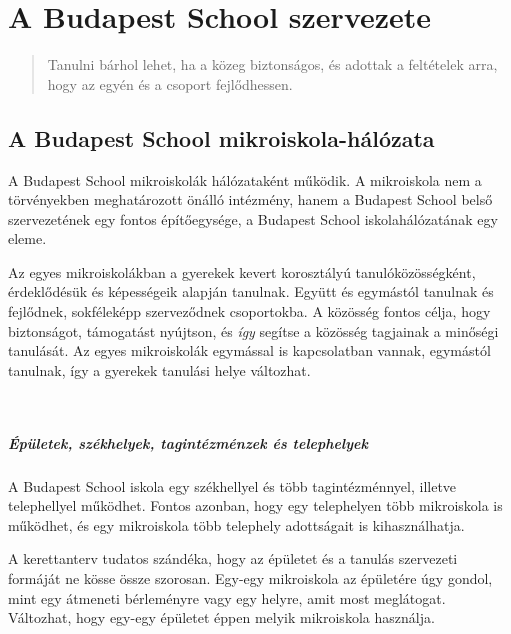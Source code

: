
\chapter{A Budapest School szervezete}
\begin{quote}
Tanulni bárhol lehet, ha a közeg biztonságos, és adottak a feltételek arra, hogy az egyén és a csoport fejlődhessen.
\end{quote}

\section{A Budapest School mikroiskola-hálózata}

 A Budapest School mikroiskolák hálózataként működik. A mikroiskola nem a
 törvényekben meghatározott önálló intézmény, hanem a Budapest School belső
 szervezetének egy fontos építőegysége, a Budapest School iskolahálózatának egy eleme.

Az egyes mikroiskolákban a gyerekek kevert korosztályú tanulóközösségként,
érdeklődésük és képességeik alapján tanulnak. Együtt és egymástól tanulnak és fejlődnek,
sokféleképp szerveződnek csoportokba. A közösség
fontos célja, hogy biztonságot, támogatást nyújtson, és \emph{így} segítse a közösség tagjainak a
minőségi tanulását. Az egyes mikroiskolák egymással is kapcsolatban vannak,
egymástól tanulnak, így a gyerekek tanulási helye változhat.

 \paragraph{Épületek, székhelyek, tagintézménzek és telephelyek}
A Budapest School iskola egy székhellyel és több tagintézménnyel, illetve telephellyel működhet. Fontos azonban, hogy egy telephelyen több mikroiskola is működhet, és egy mikroiskola több telephely adottságait is kihasználhatja.

A kerettanterv tudatos szándéka, hogy az épületet és a
tanulás szervezeti formáját ne kösse össze szorosan. Egy-egy mikroiskola az épületére úgy gondol, mint egy átmeneti bérleményre vagy egy helyre, amit most meglátogat.
Változhat, hogy egy-egy épületet éppen melyik mikroiskola használja.

\begin{comment}
nem kell ide! 
 \begin{quote}
Egy irodaépületben több cég is bérelhet irodát. A bérlők jönnek, mennek. Csak a vállalatok kis része (bár ezek a legnagyobb vállalatok) rendelkeznek állandó és saját irodaépülettel. Ettől még a vállalatok több évtizeden keresztül működhetnek, és közben akár tucatszor költözhetnek. Főleg, ha a cég mérete, fókusza változik. Hasonlóképp van egy mikroiskola a gyerekek növekedésével, az érdeklődésük, taulási céljaik átalakulásával folyamatos változásban.

Ugyanígy egy épületben több mikroiskola kaphat helyet. És ahogy államilag fenntartott iskolák épületét is lehet bérelni nyári táborokra, úgy egy épületet, akár több mikroiskola meg is oszthatja egymással.
\end{quote}
\end{comment}

